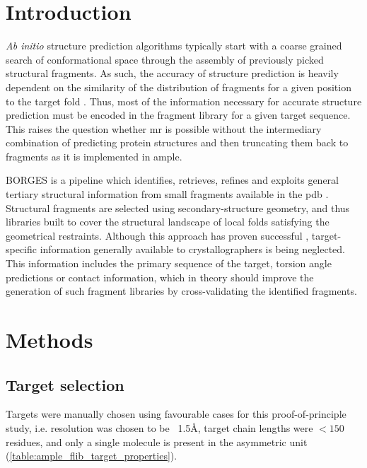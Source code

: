 \section{Introduction}

\textit{Ab initio} structure prediction algorithms typically start with a coarse grained search of conformational space through the assembly of previously picked structural fragments. As such, the accuracy of structure prediction is heavily dependent on the similarity of the distribution of fragments for a given position to the target fold \cite{Gront2011-ik}. Thus, most of the information necessary for accurate structure prediction must be encoded in the fragment library for a given target sequence. This raises the question whether \gls{mr} is possible without the intermediary combination of predicting protein structures and then truncating them back to fragments as it is implemented in \gls{ample}.

BORGES is a pipeline which identifies, retrieves, refines and exploits general tertiary structural information from small fragments available in the \gls{pdb} \cite{Sammito2013-tt}. Structural fragments are selected using secondary-structure geometry, and thus libraries built to cover the structural landscape of local folds satisfying the geometrical restraints. Although this approach has proven successful \cite{Sammito2013-tt}, target-specific information generally available to crystallographers is being neglected. This information includes the primary sequence of the target, torsion angle predictions or contact information, which in theory should improve the generation of such fragment libraries by cross-validating the identified fragments.


\section{Methods}
\subsection{Target selection}
Targets were manually chosen using favourable cases for this proof-of-principle study, i.e. resolution was chosen to be ~1.5\AA, target chain lengths were $<150$ residues, and only a single molecule is present in the asymmetric unit (\cref{table:ample_flib_target_properties}).

